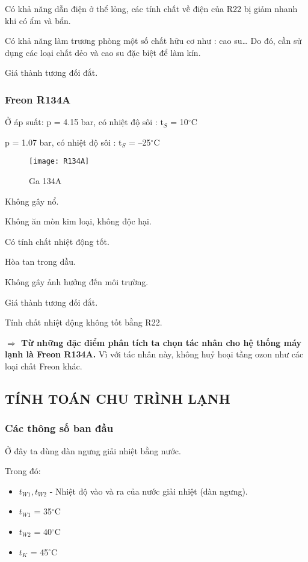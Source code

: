 \begin{table}[H]
Có khả năng dẫn điện ở thể lỏng, các tính chất về điện của R22 bị giảm nhanh khi có ẩm và bẩn.

Có khả năng làm trương phòng một số chất hữu cơ như : cao su… Do đó, cần sử dụng các loại chất dẻo và cao su đặc biệt để làm kín.

Giá thành tương đối đắt.

\subsubsection{Freon R134A}
Ở áp suất: 
\hspace{1cm}
p = 4.15 bar, có nhiệt độ sôi : t$_{S}$ = 10$^{\circ}$C

\hspace{2.95cm}
p = 1.07 bar, có nhiệt độ sôi : t$_{S}$ = –25$^{\circ}$C
\begin{figure}[H]
	\centering
	\texttt{[image: R134A]}
	\caption{Ga 134A}
\end{figure}

Không gây nổ.

Không ăn mòn kim loại, không độc hại.

Có tính chất nhiệt động tốt.

Hòa tan trong dầu.

Không gây ảnh hưởng đến môi trường.

Giá thành tương đối đắt.

Tính chất nhiệt động không tốt bằng R22.

\textbf{$\Rightarrow$ Từ những đặc điểm phân tích ta chọn tác nhân cho hệ thống máy lạnh là Freon R134A.} Vì với tác nhân này, không huỷ hoại tầng ozon như các loại chất Freon khác.

\subsection{TÍNH TOÁN CHU TRÌNH LẠNH}
\subsubsection{Các thông số ban đầu}
Ở đây ta dùng dàn ngưng giải nhiệt bằng nước.

Trong đó:
\begin{itemize}
	\item $t_{W1}, t_{W2}$ - Nhiệt độ vào và ra của nước giải nhiệt (dàn ngưng).
	\item $t_{W1}$ = 35$^{\circ}$C
	\item $t_{W2}$ = 40$^{\circ}$C
	\item $t_{K}$ = 45$^{\circ}$C
\end{itemize}


\end{table}
